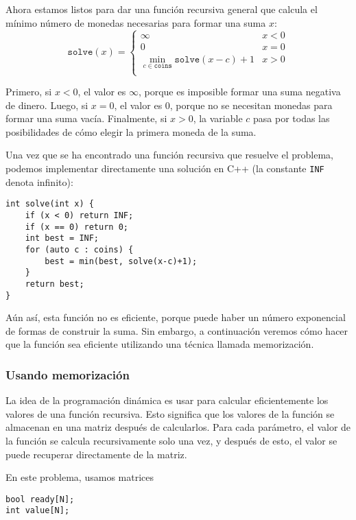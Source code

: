 Ahora estamos listos para dar una función recursiva general
que calcula el mínimo número de
monedas necesarias para formar una suma $x$:
\begin{equation*}
    \texttt{solve}(x) = \begin{cases}
               \infty               & x < 0\\
               0               & x = 0\\
               \min_{c \in \texttt{coins}} \texttt{solve}(x-c)+1 & x > 0 \\
           \end{cases}
\end{equation*}

Primero, si $x<0$, el valor es $\infty$,
porque es imposible formar una suma negativa
de dinero.
Luego, si $x=0$, el valor es $0$,
porque no se necesitan monedas para formar una suma vacía.
Finalmente, si $x>0$, la variable $c$ pasa por
todas las posibilidades de cómo elegir la primera moneda
de la suma.

Una vez que se ha encontrado una función recursiva que resuelve el problema,
podemos implementar directamente una solución en C++
(la constante \texttt{INF} denota infinito):
\begin{lstlisting}
int solve(int x) {
    if (x < 0) return INF;
    if (x == 0) return 0;
    int best = INF;
    for (auto c : coins) {
        best = min(best, solve(x-c)+1);
    }
    return best;
}
\end{lstlisting}

Aún así, esta función no es eficiente,
porque puede haber un número exponencial de formas
de construir la suma.
Sin embargo, a continuación veremos cómo hacer que la
función sea eficiente utilizando una técnica llamada memorización.

\subsubsection{Usando memorización}


La idea de la programación dinámica es usar
 para calcular eficientemente
los valores de una función recursiva.
Esto significa que los valores de la función
se almacenan en una matriz después de calcularlos.
Para cada parámetro, el valor de la función
se calcula recursivamente solo una vez, y después de esto,
el valor se puede recuperar directamente de la matriz.

En este problema, usamos matrices
\begin{lstlisting}
bool ready[N];
int value[N];
\end{lstlisting}

